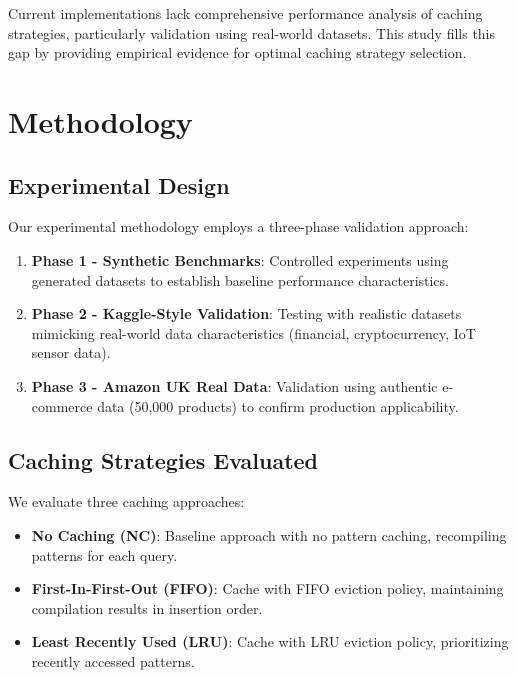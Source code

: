 \documentclass[conference]{IEEEtran}
\begin{document}
Current implementations lack comprehensive performance analysis of caching strategies, particularly validation using real-world datasets. This study fills this gap by providing empirical evidence for optimal caching strategy selection.

\section{Methodology}

\subsection{Experimental Design}

Our experimental methodology employs a three-phase validation approach:

\begin{enumerate}
\item \textbf{Phase 1 - Synthetic Benchmarks}: Controlled experiments using generated datasets to establish baseline performance characteristics.

\item \textbf{Phase 2 - Kaggle-Style Validation}: Testing with realistic datasets mimicking real-world data characteristics (financial, cryptocurrency, IoT sensor data).

\item \textbf{Phase 3 - Amazon UK Real Data}: Validation using authentic e-commerce data (50,000 products) to confirm production applicability.
\end{enumerate}

\subsection{Caching Strategies Evaluated}

We evaluate three caching approaches:

\begin{itemize}
\item \textbf{No Caching (NC)}: Baseline approach with no pattern caching, recompiling patterns for each query.

\item \textbf{First-In-First-Out (FIFO)}: Cache with FIFO eviction policy, maintaining compilation results in insertion order.

\item \textbf{Least Recently Used (LRU)}: Cache with LRU eviction policy, prioritizing recently accessed patterns.
\end{itemize}
\end{document}
